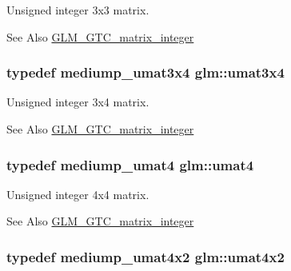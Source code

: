 Unsigned integer 3x3 matrix. 

\begin{DoxySeeAlso}{See Also}
\hyperlink{group__gtc__matrix__integer}{G\-L\-M\-\_\-\-G\-T\-C\-\_\-matrix\-\_\-integer} 
\end{DoxySeeAlso}
\hypertarget{group__gtc__matrix__integer_ga5410857d098a989a30b4017100bc2ff7}{
\subsubsection[{umat3x4}]{\setlength{\rightskip}{0pt plus 5cm}typedef mediump\-\_\-umat3x4 {\bf glm\-::umat3x4}}}\label{group__gtc__matrix__integer_ga5410857d098a989a30b4017100bc2ff7}


Unsigned integer 3x4 matrix. 

\begin{DoxySeeAlso}{See Also}
\hyperlink{group__gtc__matrix__integer}{G\-L\-M\-\_\-\-G\-T\-C\-\_\-matrix\-\_\-integer} 
\end{DoxySeeAlso}
\hypertarget{group__gtc__matrix__integer_ga7ae562000d8a8d193e9f93cf51e2e113}{
\subsubsection[{umat4}]{\setlength{\rightskip}{0pt plus 5cm}typedef mediump\-\_\-umat4 {\bf glm\-::umat4}}}\label{group__gtc__matrix__integer_ga7ae562000d8a8d193e9f93cf51e2e113}


Unsigned integer 4x4 matrix. 

\begin{DoxySeeAlso}{See Also}
\hyperlink{group__gtc__matrix__integer}{G\-L\-M\-\_\-\-G\-T\-C\-\_\-matrix\-\_\-integer} 
\end{DoxySeeAlso}
\hypertarget{group__gtc__matrix__integer_ga13e8392218e9b6e1b7f194a21b5c88bf}{
\subsubsection[{umat4x2}]{\setlength{\rightskip}{0pt plus 5cm}typedef mediump\-\_\-umat4x2 {\bf glm\-::umat4x2}}}\label{group__gtc__matrix__integer_ga13e8392218e9b6e1b7f194a21b5c88bf}



